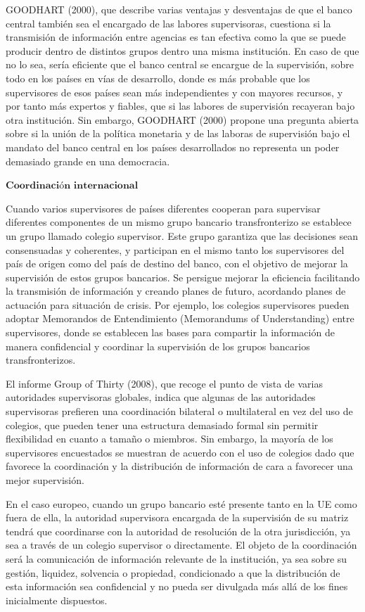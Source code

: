 \documentclass[10pt,a4paper]{article}
\begin{document}
GOODHART (2000), que describe varias ventajas y desventajas de que el banco central también sea el encargado de las labores supervisoras, cuestiona si la transmisión de información entre agencias es tan efectiva como la que se puede producir dentro de distintos grupos dentro una misma institución. En caso de que no lo sea, sería eficiente que el banco central se encargue de la supervisión, sobre todo en los países en vías de desarrollo, donde es más probable que los supervisores de esos países sean más independientes y con mayores recursos, y por tanto más expertos y fiables, que si las labores de supervisión recayeran bajo otra institución. Sin embargo, GOODHART (2000) propone una pregunta abierta sobre si la unión de la política monetaria y de las laboras de supervisión bajo el mandato del banco central en los países desarrollados no representa un poder demasiado grande en una democracia. 

$\textbf{Coordinación internacional}$

Cuando varios supervisores de países diferentes cooperan para supervisar diferentes componentes de un mismo grupo bancario transfronterizo se establece un grupo llamado colegio supervisor. Este grupo garantiza que las decisiones sean consensuadas y coherentes, y participan en el mismo tanto los supervisores del país de origen como del país de destino del banco, con el objetivo de mejorar la supervisión de estos grupos bancarios. Se persigue mejorar la eficiencia facilitando la transmisión de información y creando planes de futuro, acordando planes de actuación para situación de crisis. Por ejemplo, los colegios supervisores pueden adoptar Memorandos de Entendimiento (Memorandums of Understanding) entre supervisores, donde se establecen las bases para compartir la información de manera confidencial y coordinar la supervisión de los grupos bancarios transfronterizos. 

El informe Group of Thirty (2008), que recoge el punto de vista de varias autoridades supervisoras globales, indica que algunas de las autoridades supervisoras prefieren una coordinación bilateral o multilateral en vez del uso de colegios, que pueden tener una estructura demasiado formal sin permitir flexibilidad en cuanto a tamaño o miembros. Sin embargo, la mayoría de los supervisores encuestados se muestran de acuerdo con el uso de colegios dado que favorece la coordinación y la distribución de información de cara a favorecer una mejor supervisión. 

En el caso europeo, cuando un grupo bancario esté presente tanto en la UE como fuera de ella, la autoridad supervisora encargada de la supervisión de su matriz tendrá que coordinarse con la autoridad de resolución de la otra jurisdicción, ya sea a través de un colegio supervisor o directamente. El objeto de la coordinación será la comunicación de información relevante de la institución, ya sea sobre su gestión, liquidez, solvencia o propiedad, condicionado a que la distribución de esta información sea confidencial y no pueda ser divulgada más allá de los fines inicialmente dispuestos. 
\end{document}

